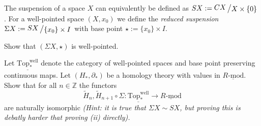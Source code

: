 \documentclass[11pt]{book}
\numberwithin{dummy}{section}
\theoremstyle{nonumberbreak}
\newenvironment{prob}[1][]{\ifthenelse{\equal{#1}{}}{\problem}{\problem[#1]}\rm}{\endproblem}
\newcommand{\Rmod}{\underline{R\textrm{-}\mathrm{mod}}}
\newcommand{\la}{\longrightarrow}
\newcommand{\Z}{\mathbb{Z}}
\newcommand{\slant}[2]{{\raisebox{.1em}{$#1$}\left/\raisebox{-.1em}{$#2$}\right.}}
\begin{document}
\begin{spacing}{1.4}
\begin{prob}
\end{prob}





\begin{prob}    %
The suspension of a space $X$ can equivalently be defined as $SX:= \slant{CX}{X \times \{0\}}$. For a well-pointed space $(X,x_0)$ we define the \textit{reduced suspension} $\Sigma X:= \slant{SX}{\{x_0\} \times I}$ with base point $\star := \{x_0\} \times I$. 
\begin{compactenum}
\item Show that $(\Sigma X, \star)$ is well-pointed.
\item Let $\underline{\mathrm{Top}_*^{\mathrm{well}}}$ denote the category of well-pointed spaces and base point preserving continuous maps. Let $(H_*, \partial_*)$ be a homology theory with values in $\Rmod$. Show that for all $n \in \Z$ the functors
$$\tilde{H}_n,\tilde{H}_{n+1} \circ \Sigma: \underline{\mathrm{Top}_*^{\mathrm{well}}} \la \Rmod$$
are naturally isomorphic \textit{(Hint: it is true that $\Sigma X \sim SX$, but proving this is debatly harder that proving (ii) directly).}
\end{compactenum}


\end{prob}
\end{spacing}
\end{document}
